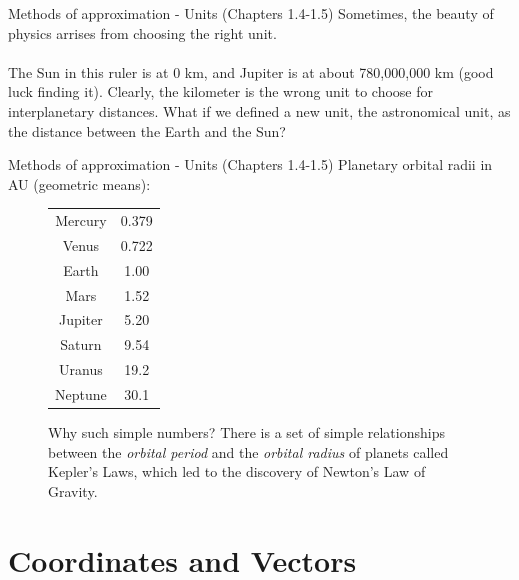 \documentclass{beamer}
\begin{document}
\begin{frame}{Methods of approximation - Units (Chapters 1.4-1.5)}
\centering
Sometimes, the beauty of physics arrises from choosing the right unit. \\
\vspace{1cm}
\small
{} \\
\vspace{1cm}
\normalsize
The Sun in this ruler is at 0 km, and Jupiter is at about 780,000,000 km (good luck finding it).  Clearly, the kilometer is the wrong unit to choose for interplanetary distances.  What if we defined a new unit, the \alert{astronomical unit}, as the distance between the Earth and the Sun?
\end{frame}

\begin{frame}{Methods of approximation - Units (Chapters 1.4-1.5)}
Planetary orbital radii in \alert{AU} (geometric means):
\begin{figure}
\begin{tabular}{| c | c |}
\hline
Mercury & 0.379 \\
Venus & 0.722 \\
Earth & 1.00 \\
Mars & 1.52 \\
Jupiter & 5.20 \\
Saturn & 9.54 \\
Uranus & 19.2 \\
Neptune & 30.1 \\
\hline
\end{tabular}
\caption{\label{tab:planets} Why such simple numbers?  There is a set of simple relationships between the \textit{orbital period} and the \textit{orbital radius} of planets called Kepler's Laws, which led to the discovery of \alert{Newton's Law of Gravity.}}
\end{figure}
\end{frame}

\section{Coordinates and Vectors}
\end{document}
